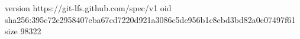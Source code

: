 version https://git-lfs.github.com/spec/v1
oid sha256:395c72e2958407eba67cd7220d921a3086c5de956b1c8cbd3bd82a0e07497f61
size 98322
